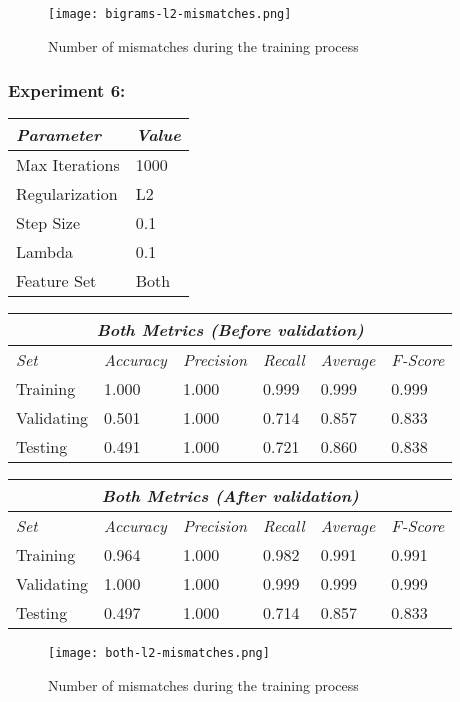 \documentclass[11pt]{article}
\begin{document}
\begin{figure}[H]
  \caption{Number of mismatches during the training process}
  \texttt{[image: bigrams-l2-mismatches.png]}
  \centering
\end{figure}



\clearpage
\subsubsection*{Experiment 6:}

\begin{table}[H]
\centering
\begin{tabular}{ |p{3cm}||p{2cm}|  }
 \hline
 \textit{Parameter} & \textit{Value} \\
 \hline
 Max Iterations   & 1000 \\
 Regularization & L2 \\
 Step Size    & 0.1 \\
 Lambda    & 0.1 \\
 Feature Set    & Both \\
 \hline
\end{tabular}
\end{table}

\begin{table}[H]
\centering
\begin{tabular}{ |p{2cm}||p{2cm}|p{2cm}|p{2cm}|p{2cm}|p{2cm}|  }
 \hline
 \multicolumn{6}{|c|}{\textbf{\textit{Both Metrics (Before validation)}}} \\
 \hline
 \textit{Set} & \textit{Accuracy} & \textit{Precision} & \textit{Recall} & \textit{Average} & \textit{F-Score} \\
 \hline
 Training   & 1.000 & 1.000 & 0.999 & 0.999 & 0.999 \\
 Validating & 0.501 & 1.000 & 0.714 & 0.857 & 0.833 \\
 Testing    & 0.491 & 1.000 & 0.721 & 0.860 & 0.838 \\
 \hline
\end{tabular}
\end{table}

\begin{table}[H]
\centering
\begin{tabular}{ |p{2cm}||p{2cm}|p{2cm}|p{2cm}|p{2cm}|p{2cm}|  }
 \hline
 \multicolumn{6}{|c|}{\textbf{\textit{Both Metrics (After validation)}}} \\
 \hline
 \textit{Set} & \textit{Accuracy} & \textit{Precision} & \textit{Recall} & \textit{Average} & \textit{F-Score} \\
 \hline
 Training   & 0.964 & 1.000 & 0.982 & 0.991 & 0.991 \\
 Validating & 1.000 & 1.000 & 0.999 & 0.999 & 0.999 \\
 Testing    & 0.497 & 1.000 & 0.714 & 0.857 & 0.833 \\
 \hline
\end{tabular}
\end{table}

\begin{figure}[H]
  \caption{Number of mismatches during the training process}
  \texttt{[image: both-l2-mismatches.png]}
  \centering
\end{figure}

%
%
\end{document}
